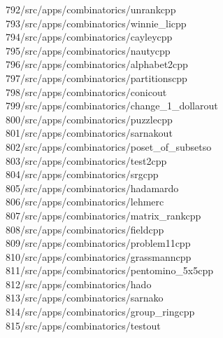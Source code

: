 \begin{tabbing}
792\>/src/apps/combinatorics/unrankcpp\\[0pt]
793\>/src/apps/combinatorics/winnie\_licpp\\[0pt]
794\>/src/apps/combinatorics/cayleycpp\\[0pt]
795\>/src/apps/combinatorics/nautycpp\\[0pt]
796\>/src/apps/combinatorics/alphabet2cpp\\[0pt]
797\>/src/apps/combinatorics/partitionscpp\\[0pt]
798\>/src/apps/combinatorics/conicout\\[0pt]
799\>/src/apps/combinatorics/change\_1\_dollarout\\[0pt]
800\>/src/apps/combinatorics/puzzlecpp\\[0pt]
801\>/src/apps/combinatorics/sarnakout\\[0pt]
802\>/src/apps/combinatorics/poset\_of\_subsetso\\[0pt]
803\>/src/apps/combinatorics/test2cpp\\[0pt]
804\>/src/apps/combinatorics/srgcpp\\[0pt]
805\>/src/apps/combinatorics/hadamardo\\[0pt]
806\>/src/apps/combinatorics/lehmerc\\[0pt]
807\>/src/apps/combinatorics/matrix\_rankcpp\\[0pt]
808\>/src/apps/combinatorics/fieldcpp\\[0pt]
809\>/src/apps/combinatorics/problem11cpp\\[0pt]
810\>/src/apps/combinatorics/grassmanncpp\\[0pt]
811\>/src/apps/combinatorics/pentomino\_5x5cpp\\[0pt]
812\>/src/apps/combinatorics/hado\\[0pt]
813\>/src/apps/combinatorics/sarnako\\[0pt]
814\>/src/apps/combinatorics/group\_ringcpp\\[0pt]
815\>/src/apps/combinatorics/testout\\[0pt]

\end{tabbing}
